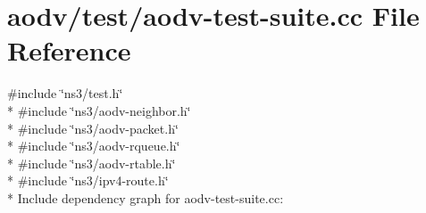 \hypertarget{aodv-test-suite_8cc}{}\section{aodv/test/aodv-\/test-\/suite.cc File Reference}
\label{aodv-test-suite_8cc}
{\ttfamily \#include \char`\"{}ns3/test.\+h\char`\"{}}\\*
{\ttfamily \#include \char`\"{}ns3/aodv-\/neighbor.\+h\char`\"{}}\\*
{\ttfamily \#include \char`\"{}ns3/aodv-\/packet.\+h\char`\"{}}\\*
{\ttfamily \#include \char`\"{}ns3/aodv-\/rqueue.\+h\char`\"{}}\\*
{\ttfamily \#include \char`\"{}ns3/aodv-\/rtable.\+h\char`\"{}}\\*
{\ttfamily \#include \char`\"{}ns3/ipv4-\/route.\+h\char`\"{}}\\*
Include dependency graph for aodv-\/test-\/suite.cc\+:
